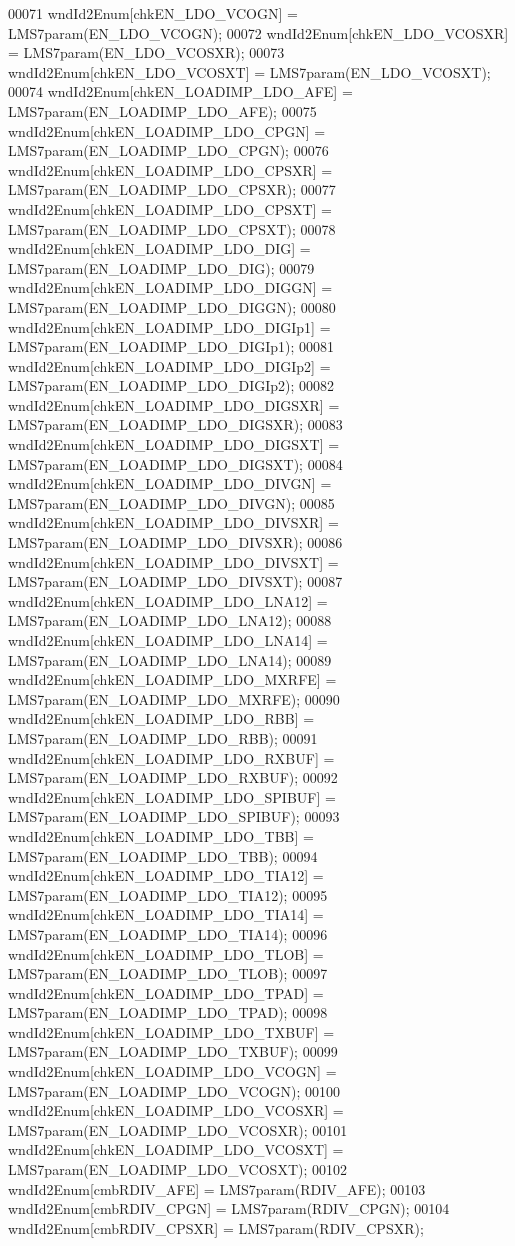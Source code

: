 \begin{DoxyCode}
00071     wndId2Enum[chkEN_LDO_VCOGN] = LMS7param(EN_LDO_VCOGN);
00072     wndId2Enum[chkEN_LDO_VCOSXR] = LMS7param(EN_LDO_VCOSXR);
00073     wndId2Enum[chkEN_LDO_VCOSXT] = LMS7param(EN_LDO_VCOSXT);
00074     wndId2Enum[chkEN_LOADIMP_LDO_AFE] = LMS7param(EN_LOADIMP_LDO_AFE);
00075     wndId2Enum[chkEN_LOADIMP_LDO_CPGN] = LMS7param(EN_LOADIMP_LDO_CPGN);
00076     wndId2Enum[chkEN_LOADIMP_LDO_CPSXR] = LMS7param(EN_LOADIMP_LDO_CPSXR);
00077     wndId2Enum[chkEN_LOADIMP_LDO_CPSXT] = LMS7param(EN_LOADIMP_LDO_CPSXT);
00078     wndId2Enum[chkEN_LOADIMP_LDO_DIG] = LMS7param(EN_LOADIMP_LDO_DIG);
00079     wndId2Enum[chkEN_LOADIMP_LDO_DIGGN] = LMS7param(EN_LOADIMP_LDO_DIGGN);
00080     wndId2Enum[chkEN_LOADIMP_LDO_DIGIp1] = LMS7param(EN_LOADIMP_LDO_DIGIp1);
00081     wndId2Enum[chkEN_LOADIMP_LDO_DIGIp2] = LMS7param(EN_LOADIMP_LDO_DIGIp2);
00082     wndId2Enum[chkEN_LOADIMP_LDO_DIGSXR] = LMS7param(EN_LOADIMP_LDO_DIGSXR);
00083     wndId2Enum[chkEN_LOADIMP_LDO_DIGSXT] = LMS7param(EN_LOADIMP_LDO_DIGSXT);
00084     wndId2Enum[chkEN_LOADIMP_LDO_DIVGN] = LMS7param(EN_LOADIMP_LDO_DIVGN);
00085     wndId2Enum[chkEN_LOADIMP_LDO_DIVSXR] = LMS7param(EN_LOADIMP_LDO_DIVSXR);
00086     wndId2Enum[chkEN_LOADIMP_LDO_DIVSXT] = LMS7param(EN_LOADIMP_LDO_DIVSXT);
00087     wndId2Enum[chkEN_LOADIMP_LDO_LNA12] = LMS7param(EN_LOADIMP_LDO_LNA12);
00088     wndId2Enum[chkEN_LOADIMP_LDO_LNA14] = LMS7param(EN_LOADIMP_LDO_LNA14);
00089     wndId2Enum[chkEN_LOADIMP_LDO_MXRFE] = LMS7param(EN_LOADIMP_LDO_MXRFE);
00090     wndId2Enum[chkEN_LOADIMP_LDO_RBB] = LMS7param(EN_LOADIMP_LDO_RBB);
00091     wndId2Enum[chkEN_LOADIMP_LDO_RXBUF] = LMS7param(EN_LOADIMP_LDO_RXBUF);
00092     wndId2Enum[chkEN_LOADIMP_LDO_SPIBUF] = LMS7param(EN_LOADIMP_LDO_SPIBUF);
00093     wndId2Enum[chkEN_LOADIMP_LDO_TBB] = LMS7param(EN_LOADIMP_LDO_TBB);
00094     wndId2Enum[chkEN_LOADIMP_LDO_TIA12] = LMS7param(EN_LOADIMP_LDO_TIA12);
00095     wndId2Enum[chkEN_LOADIMP_LDO_TIA14] = LMS7param(EN_LOADIMP_LDO_TIA14);
00096     wndId2Enum[chkEN_LOADIMP_LDO_TLOB] = LMS7param(EN_LOADIMP_LDO_TLOB);
00097     wndId2Enum[chkEN_LOADIMP_LDO_TPAD] = LMS7param(EN_LOADIMP_LDO_TPAD);
00098     wndId2Enum[chkEN_LOADIMP_LDO_TXBUF] = LMS7param(EN_LOADIMP_LDO_TXBUF);
00099     wndId2Enum[chkEN_LOADIMP_LDO_VCOGN] = LMS7param(EN_LOADIMP_LDO_VCOGN);
00100     wndId2Enum[chkEN_LOADIMP_LDO_VCOSXR] = LMS7param(EN_LOADIMP_LDO_VCOSXR);
00101     wndId2Enum[chkEN_LOADIMP_LDO_VCOSXT] = LMS7param(EN_LOADIMP_LDO_VCOSXT);
00102     wndId2Enum[cmbRDIV_AFE] = LMS7param(RDIV_AFE);
00103     wndId2Enum[cmbRDIV_CPGN] = LMS7param(RDIV_CPGN);
00104     wndId2Enum[cmbRDIV_CPSXR] = LMS7param(RDIV_CPSXR);

\end{DoxyCode}
